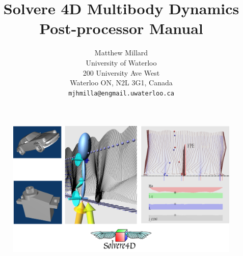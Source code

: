 \documentclass[singlecolumn,12pt]{article}
\begin{document}
\title{Solvere 4D Multibody Dynamics \\ Post-processor Manual}

\author{Matthew Millard\\
University of Waterloo\\
 200 University Ave West\\
Waterloo ON, N2L 3G1, Canada\\
{\tt\small mjhmilla@engmail.uwaterloo.ca}}





\maketitle

\begin{figure}[!h]
\includegraphics[width = \textwidth, height = \textheight, keepaspectratio= true]{fig_splash}
\end{figure}
\end{document}

